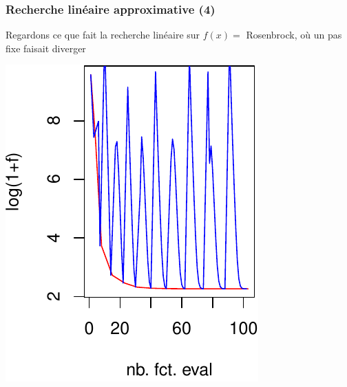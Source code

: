 \documentclass[12pt]{beamer}
\begin{document}
\begin{frame}
\frametitle{Recherche linéaire approximative (4)} 
Regardons ce que fait la recherche linéaire sur $f(x)=$ Rosenbrock, où un pas fixe faisait diverger
\begin{center}
\begin{minipage}[b]{0.3\textwidth}
\includegraphics[width=\textwidth]{gradient_rosen_LS_f-crop.pdf} 
\end{minipage}
\hspace{1.cm}
\begin{minipage}[b]{0.3\textwidth}

\end{minipage}
\end{center}
\end{frame}
\end{document}
